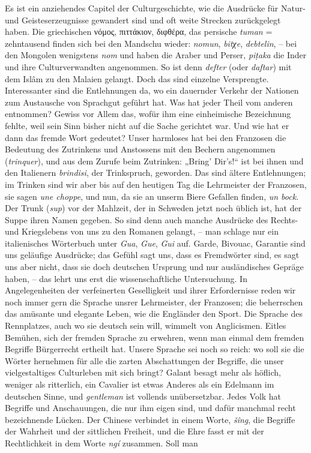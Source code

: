 {Es ist ein anziehendes Capitel der Culturgeschichte, wie die Ausdrücke für Natur- und Geisteserzeugnisse gewandert sind und oft weite Strecken zurückgelegt haben. Die griechischen νόμος, πιττάκιον, διφθέρα, das persische \textit{tuman} = zehntausend finden sich bei den Mandschu wieder: \textit{nomun}, \textit{bitχe}, \textit{debtelin},  – bei den Mongolen wenigstens \textit{nom} und  haben die Araber und Perser, \textit{piṭaka} die Inder und ihre Culturverwandten angenommen. So ist denn \textit{defter} (oder \textit{daftar}) mit dem Islâm zu den Malaien gelangt. Doch das sind einzelne Versprengte. Interessanter sind die Entlehnungen da, wo ein dauernder Verkehr der Nationen zum Austausche von Sprachgut geführt hat. Was hat jeder Theil vom anderen entnommen? Gewiss vor Allem das, wofür ihm eine einheimische Bezeichnung fehlte, weil sein Sinn bisher nicht auf die Sache gerichtet war. Und wie hat er dann das fremde Wort gedeutet? Unser harmloses  hat bei den Franzosen die Bedeutung des Zutrinkens und Anstossens mit den Bechern angenommen (\textit{trinquer}), und aus dem Zurufe beim Zutrinken: „Bring’ Dir’s!“ ist bei ihnen und den Italienern \textit{brindisi}, der Trinkspruch, geworden. Das sind ältere Entlehnungen; im Trinken sind wir aber bis auf den heutigen Tag die Lehrmeister der Franzosen, sie sagen \textit{une choppe}, und nun, da sie an unserm Biere Gefallen finden, \textit{un bock}. Der Trunk (\textit{sup}) vor der Mahlzeit, der in Schweden jetzt noch üblich ist, hat der Suppe ihren Namen gegeben. So sind denn auch manche Ausdrücke des Rechts- und Kriegslebens von uns zu \label{fp.260} den Romanen gelangt, – man schlage nur ein italienisches Wörterbuch unter \textit{Gua}, \textit{Gue}, \textit{Gui} auf. Garde, Bivouac, Garantie sind uns geläufige Ausdrücke; das Gefühl sagt uns, dass es Fremdwörter sind, es sagt uns aber nicht, dass sie doch deutschen Ursprung und nur ausländisches Gepräge haben, – das lehrt uns erst die wissenschaftliche Untersuchung. In Angelegenheiten der verfeinerten Geselligkeit und ihrer Erfordernisse reden wir noch immer gern die Sprache unsrer Lehrmeister, der Franzosen; die beherrschen das amüsante und elegante Leben, wie die Engländer den Sport. Die Sprache des Rennplatzes, auch wo sie deutsch sein will, wimmelt von Anglicismen. Eitles Bemühen, sich der fremden Sprache zu erwehren, wenn man einmal dem fremden Begriffe Bürgerrecht ertheilt hat. Unsere Sprache sei noch so reich: wo soll sie die Wörter hernehmen für alle die zarten Abschattungen der Begriffe, die unser vielgestaltiges Culturleben mit sich bringt? Galant besagt mehr als höflich, weniger als ritterlich, ein Cavalier ist etwas Anderes als ein Edelmann im deutschen \label{sp.265} Sinne, und \textit{gentleman} ist vollends unübersetzbar. Jedes Volk hat Begriffe und Anschauungen, die nur ihm eigen sind, und dafür manchmal recht bezeichnende Lücken. \largerpage[1]Der Chinese verbindet in einem Worte, \textit{šîng}, die Begriffe der Wahrheit und der sittlichen Freiheit, und die Ehre fasst er mit der Rechtlichkeit in dem Worte \textit{ngí} zusammen. Soll man }
